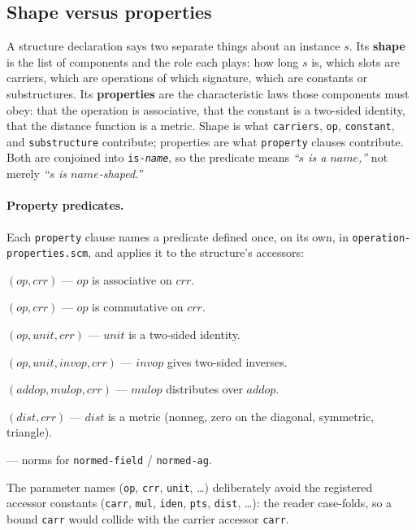 \subsection{Shape versus properties}
\label{sec:shape-vs-property}

A structure declaration says two separate things about an instance $s$.
Its \textbf{shape} is the list of components and the role each plays: how long
$s$ is, which slots are carriers, which are operations of which
signature, which are constants or substructures.  Its \textbf{properties}
are the characteristic laws those components must obey: that the
operation is associative, that the constant is a two-sided identity, that
the distance function is a metric.  Shape is what \texttt{carriers},
\texttt{op}, \texttt{constant}, and \texttt{substructure} contribute;
properties are what \texttt{property} clauses contribute.  Both are
conjoined into \texttt{is-\textit{name}}, so the predicate means
\emph{``$s$ is a $\mathit{name}$,''} not merely \emph{``$s$ is
$\mathit{name}$-shaped.''}

\paragraph{Property predicates.}
Each \texttt{property} clause names a predicate defined once, on its own,
in \texttt{operation-properties.scm}, and applies it to the structure's
accessors:
\begin{description}[leftmargin=2.4cm, style=nextline]
\item[\texttt{is-associative}] $(op, crr)$ --- $op$ is associative on $crr$.
\item[\texttt{is-commutative}] $(op, crr)$ --- $op$ is commutative on $crr$.
\item[\texttt{is-identity}] $(op, unit, crr)$ --- $unit$ is a two-sided identity.
\item[\texttt{has-inverses}] $(op, unit, invop, crr)$ --- $invop$ gives two-sided inverses.
\item[\texttt{is-distributive}] $(addop, mulop, crr)$ --- $mulop$ distributes over $addop$.
\item[\texttt{is-metric}] $(dist, crr)$ --- $dist$ is a metric (nonneg, zero on the diagonal, symmetric, triangle).
\item[\texttt{is-norm}, \texttt{is-group-norm}] --- norms for \texttt{normed-field} / \texttt{normed-ag}.
\end{description}
The parameter names (\texttt{op}, \texttt{crr}, \texttt{unit}, \ldots)
deliberately avoid the registered accessor constants
(\texttt{carr}, \texttt{mul}, \texttt{iden}, \texttt{pts}, \texttt{dist}, \ldots):
the reader case-folds, so a bound \texttt{carr} would collide with the
carrier accessor \texttt{carr}.

